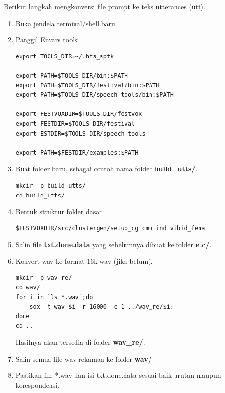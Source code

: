 \documentclass[12pt,]{article}
\begin{document}
	Berikut langkah mengkonversi file prompt ke teks utterances (utt).

	\begin{enumerate}
		\item Buka jendela terminal/shell baru.

		\item Panggil Envars tools:
		\begin{verbatim}
export TOOLS_DIR=~/.hts_sptk

export PATH=$TOOLS_DIR/bin:$PATH
export PATH=$TOOLS_DIR/festival/bin:$PATH
export PATH=$TOOLS_DIR/speech_tools/bin:$PATH

export FESTVOXDIR=$TOOLS_DIR/festvox
export FESTDIR=$TOOLS_DIR/festival
export ESTDIR=$TOOLS_DIR/speech_tools

export PATH=$FESTDIR/examples:$PATH
		\end{verbatim}

		\item Buat folder baru, sebagai contoh nama folder \textbf{build\_utts/}.
		\begin{verbatim}
mkdir -p build_utts/
cd build_utts/
		\end{verbatim}

		\item Bentuk struktur folder dasar
		\begin{verbatim}
$FESTVOXDIR/src/clustergen/setup_cg cmu ind vibid_fena
		\end{verbatim}

		\item Salin file \textbf{txt.done.data} yang sebelumnya dibuat ke folder \textbf{etc/}.

		\item Konvert wav ke format 16k wav (jika belum).
		\begin{verbatim}
mkdir -p wav_re/
cd wav/
for i in `ls *.wav`;do
	sox -t wav $i -r 16000 -c 1 ../wav_re/$i;
done
cd ..
		\end{verbatim}

		Hasilnya akan tersedia di folder \textbf{wav\_re/}.

		\item Salin semua file wav rekaman ke folder \textbf{wav/}

		\item Pastikan file *.wav dan isi txt.done.data sesuai baik urutan maupun korespondensi.


\end{enumerate}
\end{document}
